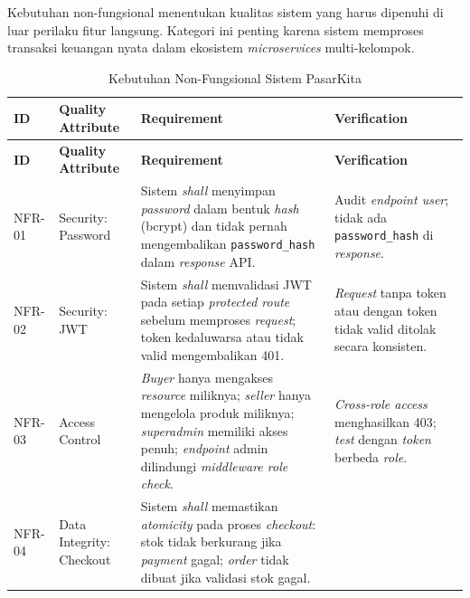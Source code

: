 
Kebutuhan non-fungsional menentukan kualitas sistem yang harus dipenuhi di luar
perilaku fitur langsung. Kategori ini penting karena sistem memproses transaksi
keuangan nyata dalam ekosistem \textit{microservices} multi-kelompok.

\begin{longtable}{|L{1cm}|L{2.5cm}|L{6.5cm}|L{4.5cm}|}
    \caption{Kebutuhan Non-Fungsional Sistem PasarKita}
    \label{tab:nonfunctional-req} \\
    \hline
    \textbf{ID} & \textbf{Quality Attribute} & \textbf{Requirement}
        & \textbf{Verification} \\
    \hline
    \endfirsthead
    \hline
    \textbf{ID} & \textbf{Quality Attribute} & \textbf{Requirement}
        & \textbf{Verification} \\
    \hline
    \endhead
    \hline
    \endfoot
    NFR-01
        & Security: Password
        & Sistem \textit{shall} menyimpan \textit{password} dalam bentuk
          \textit{hash} (bcrypt) dan tidak pernah mengembalikan
          \texttt{password\_hash} dalam \textit{response} API.
        & Audit \textit{endpoint user}; tidak ada \texttt{password\_hash} di
          \textit{response}. \\
    \hline
    NFR-02
        & Security: JWT
        & Sistem \textit{shall} memvalidasi JWT pada setiap \textit{protected
          route} sebelum memproses \textit{request}; token kedaluwarsa atau tidak
          valid mengembalikan 401.
        & \textit{Request} tanpa token atau dengan token tidak valid ditolak
          secara konsisten. \\
    \hline
    NFR-03
        & Access Control
        & \textit{Buyer} hanya mengakses \textit{resource} miliknya;
          \textit{seller} hanya mengelola produk miliknya; \textit{superadmin}
          memiliki akses penuh; \textit{endpoint} admin dilindungi
          \textit{middleware role check}.
        & \textit{Cross-role access} menghasilkan 403; \textit{test} dengan
          \textit{token} berbeda \textit{role}. \\
    \hline
    NFR-04
        & Data Integrity: Checkout
        & Sistem \textit{shall} memastikan \textit{atomicity} pada proses
          \textit{checkout}: stok tidak berkurang jika \textit{payment} gagal;
          \textit{order} tidak dibuat jika validasi stok gagal.

\end{longtable}
